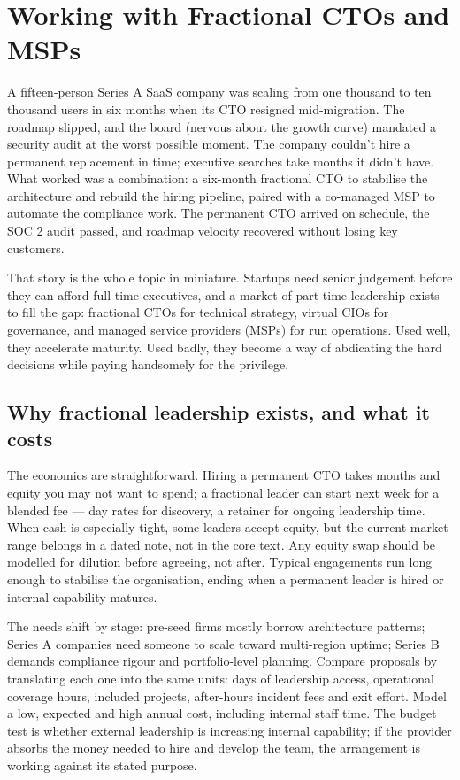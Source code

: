 \section{Working with Fractional CTOs and MSPs}
A fifteen-person Series A SaaS company was scaling from one thousand to ten thousand users in six months when its CTO resigned mid-migration. The roadmap slipped, and the board (nervous about the growth curve) mandated a security audit at the worst possible moment. The company couldn't hire a permanent replacement in time; executive searches take months it didn't have. What worked was a combination: a six-month fractional CTO to stabilise the architecture and rebuild the hiring pipeline, paired with a co-managed MSP to automate the compliance work. The permanent CTO arrived on schedule, the SOC 2 audit passed, and roadmap velocity recovered without losing key customers.


That story is the whole topic in miniature. Startups need senior judgement before they can afford full-time executives, and a market of part-time leadership exists to fill the gap: fractional CTOs for technical strategy, virtual CIOs for governance, and managed service providers (MSPs) for run operations. Used well, they accelerate maturity. Used badly, they become a way of abdicating the hard decisions while paying handsomely for the privilege.



\subsection{Why fractional leadership exists, and what it costs}


The economics are straightforward. Hiring a permanent CTO takes months and equity you may not want to spend; a fractional leader can start next week for a blended fee — day rates for discovery, a retainer for ongoing leadership time. When cash is especially tight, some leaders accept equity, but the current market range belongs in a dated note, not in the core text. Any equity swap should be modelled for dilution before agreeing, not after. Typical engagements run long enough to stabilise the organisation, ending when a permanent leader is hired or internal capability matures.


The needs shift by stage: pre-seed firms mostly borrow architecture patterns; Series A companies need someone to scale toward multi-region uptime; Series B demands compliance rigour and portfolio-level planning. Compare proposals by translating each one into the same units: days of leadership access, operational coverage hours, included projects, after-hours incident fees and exit effort. Model a low, expected and high annual cost, including internal staff time. The budget test is whether external leadership is increasing internal capability; if the provider absorbs the money needed to hire and develop the team, the arrangement is working against its stated purpose.



